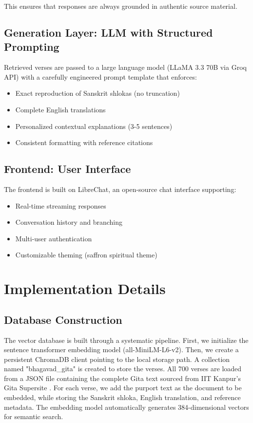 \documentclass[conference]{IEEEtran}
\begin{document}
This ensures that responses are always grounded in authentic source material.

\subsection{Generation Layer: LLM with Structured Prompting}
Retrieved verses are passed to a large language model (LLaMA 3.3 70B via Groq API) with a carefully engineered prompt template that enforces:
\begin{itemize}
    \item Exact reproduction of Sanskrit shlokas (no truncation)
    \item Complete English translations
    \item Personalized contextual explanations (3-5 sentences)
    \item Consistent formatting with reference citations
\end{itemize}

\subsection{Frontend: User Interface}
The frontend is built on LibreChat, an open-source chat interface supporting:
\begin{itemize}
    \item Real-time streaming responses
    \item Conversation history and branching
    \item Multi-user authentication
    \item Customizable theming (saffron spiritual theme)
\end{itemize}

\section{Implementation Details}

\subsection{Database Construction}
The vector database is built through a systematic pipeline. First, we initialize the sentence transformer embedding model (all-MiniLM-L6-v2). Then, we create a persistent ChromaDB client pointing to the local storage path. A collection named "bhagavad\_gita" is created to store the verses. All 700 verses are loaded from a JSON file containing the complete Gita text sourced from IIT Kanpur's Gita Supersite \cite{gitasupersite}. For each verse, we add the purport text as the document to be embedded, while storing the Sanskrit shloka, English translation, and reference metadata. The embedding model automatically generates 384-dimensional vectors for semantic search.
\end{document}
